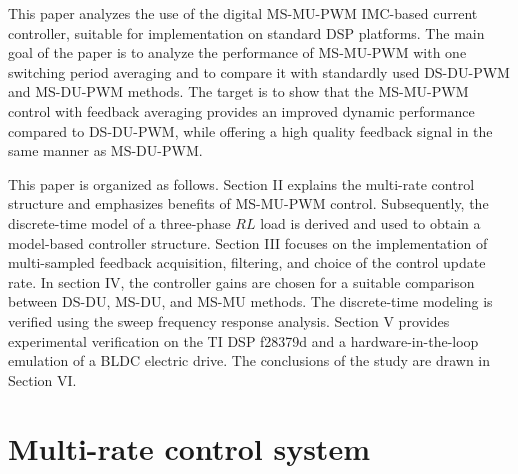 \documentclass[conference]{IEEEtran}
\begin{document}
This paper analyzes the use of the digital MS-MU-PWM IMC-based current controller, suitable for implementation on standard DSP platforms. The main goal of the paper is to analyze the performance of MS-MU-PWM with one switching period averaging and to compare it with standardly used DS-DU-PWM and MS-DU-PWM methods. 
The target is to show that the MS-MU-PWM control with feedback averaging provides an improved dynamic performance compared to DS-DU-PWM, while offering a high quality feedback signal in the same manner as MS-DU-PWM.

This paper is organized as follows. Section II explains the multi-rate control structure and emphasizes benefits of MS-MU-PWM control. Subsequently, the discrete-time model of a three-phase $RL$ load is derived and used to obtain a model-based controller structure. Section III focuses on the implementation of multi-sampled feedback acquisition, filtering, and choice of the control update rate. In section IV, the controller gains are chosen for a suitable comparison between DS-DU, MS-DU, and MS-MU methods. The discrete-time modeling is verified using the sweep frequency response analysis. Section V provides experimental verification on the TI DSP f28379d and a hardware-in-the-loop emulation of a BLDC electric drive. The conclusions of the study are drawn in Section VI.
 
\section{Multi-rate control system}
\end{document}
